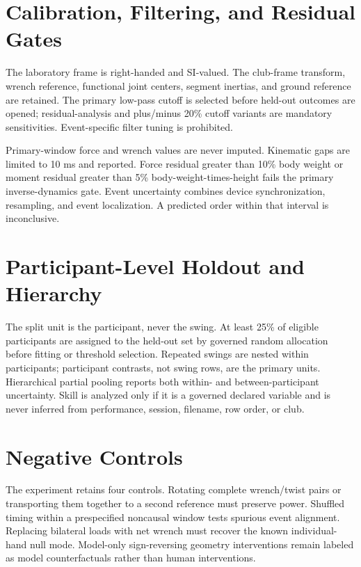 \documentclass[
  letterpaper,
]{report}
\begin{document}
\section{Calibration, Filtering, and Residual
Gates}\label{calibration-filtering-and-residual-gates}

The laboratory frame is right-handed and SI-valued. The club-frame
transform, wrench reference, functional joint centers, segment inertias,
and ground reference are retained. The primary low-pass cutoff is
selected before held-out outcomes are opened; residual-analysis and
plus/minus 20\% cutoff variants are mandatory sensitivities.
Event-specific filter tuning is prohibited.

Primary-window force and wrench values are never imputed. Kinematic gaps
are limited to 10 ms and reported. Force residual greater than 10\% body
weight or moment residual greater than 5\% body-weight-times-height
fails the primary inverse-dynamics gate. Event uncertainty combines
device synchronization, resampling, and event localization. A predicted
order within that interval is inconclusive.

\section{Participant-Level Holdout and
Hierarchy}\label{participant-level-holdout-and-hierarchy}

The split unit is the participant, never the swing. At least 25\% of
eligible participants are assigned to the held-out set by governed
random allocation before fitting or threshold selection. Repeated swings
are nested within participants; participant contrasts, not swing rows,
are the primary units. Hierarchical partial pooling reports both within-
and between-participant uncertainty. Skill is analyzed only if it is a
governed declared variable and is never inferred from performance,
session, filename, row order, or club.

\section{Negative Controls}\label{negative-controls}

The experiment retains four controls. Rotating complete wrench/twist
pairs or transporting them together to a second reference must preserve
power. Shuffled timing within a prespecified noncausal window tests
spurious event alignment. Replacing bilateral loads with net wrench must
recover the known individual-hand null mode. Model-only sign-reversing
geometry interventions remain labeled as model counterfactuals rather
than human interventions.
\end{document}
